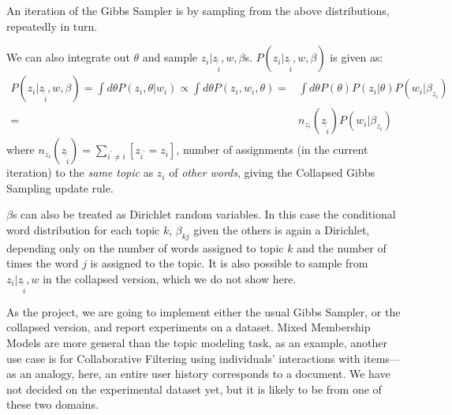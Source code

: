 \documentclass{article}%
\begin{document}
An iteration of the Gibbs Sampler is by sampling from the above distributions, repeatedly in turn. 

We can also integrate out $\theta$ and sample $z_i|z_{\not{i}}, w, \beta$s. $P(z_i|z_{\not{i}}, w, \beta)$ is given as:
\begin{align*}
P(z_i|z_{\not{i}}, w, \beta) = \int d\theta P(z_i, \theta|w_i) \propto \int d\theta P(z_i, w_i, \theta) =& \int d\theta P(\theta) P(z_i|\theta) P(w_i|\beta_{z_i})\\
=&n_{z_i}(z_{\not{i}})P(w_i|\beta_{z_i})
\end{align*}
where $n_{z_i}(z_{\not{i}}) = \sum_{i^\prime \neq i}[z_{i^\prime} = z_i]$, number of assignments (in the current iteration) to the \textit{same topic} as $z_i$ of \textit{other words}, giving the Collapsed Gibbs Sampling update rule.

$\beta$s can also be treated as Dirichlet random variables. In this case the conditional word distribution for each topic $k$, $\beta_{kj}$ given the others is again a Dirichlet, depending only on the number of words assigned to topic $k$ and the number of times the word $j$ is assigned to the topic. It is also possible to sample from $z_i|z_{\not{i}}, w$ in the collapsed version, which we do not show here.

As the project, we are going to implement either the usual Gibbs Sampler, or the collapsed version, and report experiments on a dataset. Mixed Membership Models are more general than the topic modeling task, as an example, another use case is for Collaborative Filtering using individuals' interactions with items---as an analogy, here, an entire user history corresponds to a document. We have not decided on the experimental dataset yet, but it is likely to be from one of these two domains.
\end{document}
